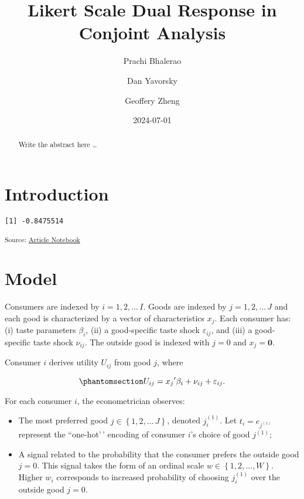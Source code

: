 \documentclass[
  letterpaper,
  DIV=11,
  numbers=noendperiod]{scrartcl}
\title{Likert Scale Dual Response in Conjoint Analysis}
\author{Prachi Bhalerao \and Dan Yavorsky \and Geoffery Zheng}
\date{2024-07-01}
\providecommand{\tightlist}{%
  \setlength{\itemsep}{0pt}\setlength{\parskip}{0pt}}\usepackage{longtable,booktabs,array}
\begin{document}
\maketitle
\begin{abstract}
Write the abstract here \ldots{}
\end{abstract}

\section{Introduction}\label{sec-intro}

\begin{verbatim}
[1] -0.8475514
\end{verbatim}

\textsubscript{Source:
\href{https://dyavorsky.github.io/likert_dualresponse/index.qmd.html}{Article
Notebook}}

\section{Model}\label{sec-model}

Consumers are indexed by \(i=1,2,\ldots\,I\). Goods are indexed by
\(j=1,2,\ldots\,J\) and each good is characterized by a vector of
characteristics \(x_j\). Each consumer has: (i) taste parameters
\(\beta_i\), (ii) a good-specific taste shock \(\varepsilon_{ij}\), and
(iii) a good-specific taste shock \(\nu_{ij}\). The outside good is
indexed with \(j=0\) and \(x_j = \mathbf{0}\).

Consumer \(i\) derives utility \(U_{ij}\) from good \(j\), where

\begin{equation}\phantomsection\label{eq-utility}{
U_{ij} = {x_j}' \beta_{i} + \nu_{ij} + \varepsilon_{ij}.
}\end{equation}

For each consumer \(i\), the econometrician observes:

\begin{itemize}
\tightlist
\item
  The most preferred good
  \(j \in \left\lbrace 1, 2, \ldots\,J\right\rbrace\), denoted
  \(j_i^{(1)}\). Let \(t_i = e_{j^{(1)}}\) represent the ``one-hot'\,'
  encoding of consumer \(i\)'s choice of good \(j^{(1)}\);
\item
  A signal related to the probability that the consumer prefers the
  outside good \(j=0\). This signal takes the form of an ordinal scale
  \(w \in \left\lbrace 1, 2, \ldots, W \right\rbrace\). Higher \(w_i\)
  corresponds to increased probability of choosing \(j_i^{(1)}\) over
  the outside good \(j=0\).
\end{itemize}
\end{document}
